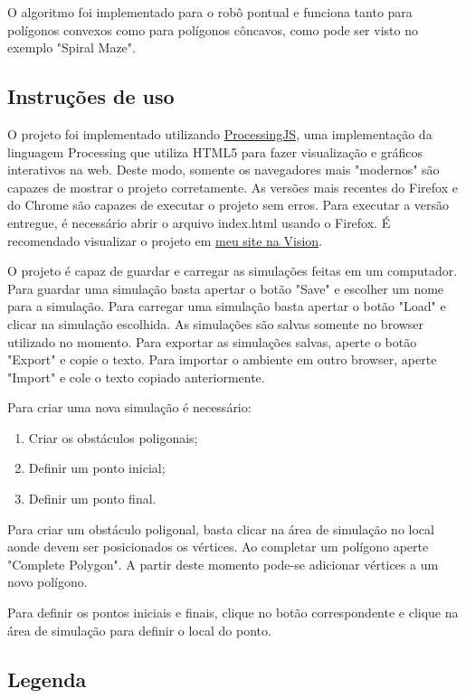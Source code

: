 \documentclass[11pt]{article} %
\begin{document}
O algoritmo foi implementado para o robô pontual e funciona tanto para polígonos convexos como para polígonos côncavos, como pode ser visto no exemplo "Spiral Maze".

\subsection{Instruções de uso}

O projeto foi implementado utilizando  \href{http://processingjs.org/}{ProcessingJS}, uma implementação da linguagem Processing que utiliza HTML5 para fazer visualização e gráficos interativos na web. Deste modo, somente os navegadores mais "modernos" são capazes de mostrar o projeto corretamente. As versões mais recentes do Firefox e do Chrome são capazes de executar o projeto sem erros. Para executar a versão entregue, é necessário abrir o arquivo index.html usando o Firefox. É recomendado visualizar o projeto em \href{http://vision.ime.usp.br/~igor/geocomp}{meu site na Vision}.

O projeto é capaz de guardar e carregar as simulações feitas em um computador. Para guardar uma simulação basta apertar o botão "Save" e escolher um nome para a simulação. Para carregar uma simulação basta apertar o botão "Load" e clicar na simulação escolhida. As simulações são salvas somente no browser utilizado no momento. Para exportar as simulações salvas, aperte o botão "Export" e copie o texto. Para importar o ambiente em outro browser, aperte "Import" e cole o texto copiado anteriormente.

Para criar uma nova simulação é necessário:
\begin{enumerate}
	\item Criar os obstáculos poligonais;
	\item Definir um ponto inicial;
	\item Definir um ponto final.
\end{enumerate}

Para criar um obstáculo poligonal, basta clicar na área de simulação no local aonde devem ser posicionados os vértices. Ao completar um polígono aperte "Complete Polygon". A partir deste momento pode-se adicionar vértices a um novo polígono.

Para definir os pontos iniciais e finais, clique no botão correspondente e clique na área de simulação para definir o local do ponto.

\subsection{Legenda}
\end{document}
